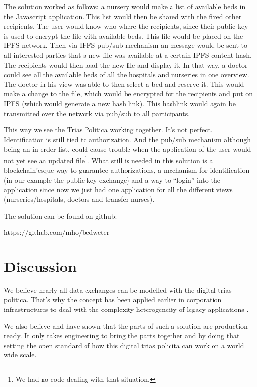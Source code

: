 \documentclass{article}
\begin{document}
The solution worked as follows: a nursery would make a list of available beds in the Javascript application. This list would then be shared with the fixed other recipients. The user would know who where the recipients, since their public key is used to encrypt the file with available beds. This file would be placed on the IPFS network. Then via IPFS pub/sub mechanism an message would be sent to all interested parties that a new file was available at a certain IPFS content hash. The recipients would then load the new file and display it. In that way, a doctor could see all the available beds of all the hospitals and nurseries in one overview. The doctor in his view was able to then select a bed and reserve it. This would make a change to the file, which would be encrypted for the recipients and put on IPFS (which would generate a new hash link). This hashlink would again be transmitted over the network via pub/sub to all participants.

This way we see the Trias Politica working together. It's not perfect. Identification is still tied to authorization. And the pub/sub mechanism although being an in order list, could cause trouble when the application of the user would not yet see an updated file\footnote{We had no code dealing with that situation.}. What still is needed in this solution is a blockchain'esque way to guarantee authorizations, a mechanism for identification (in our example the public key exchange) and a way to ``login'' into the application since now we just had one application for all the different views (nurseries/hospitals, doctors and transfer nurses).

The solution can be found on github: \SetWatermarkText{}

https://github.com/mho/bedweter

\section{Discussion}
We believe nearly all data exchanges can be modelled with the digital trias politica. That's why the concept has been applied earlier in corporation infrastructures to deal with the complexity heterogeneity of legacy applications \cite{harnik2011secure}. 

We also believe and have shown that the parts of such a solution are production ready. It only takes engineering to bring the parts together and by doing that setting the open standard of how this digital trias policita can work on a world wide scale. 
\end{document}

